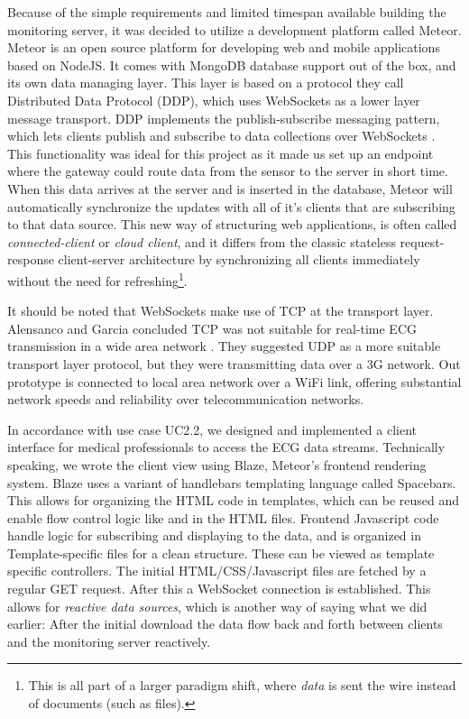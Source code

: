 
Because of the simple requirements and limited timespan available building the monitoring server, it was decided to utilize a development platform called Meteor. Meteor \cite{meteor} is an open source platform for developing web and mobile applications based on NodeJS. It comes with MongoDB database support out of the box, and its own data managing layer. This layer is based on a protocol they call Distributed Data Protocol (DDP), which uses WebSockets as a lower layer message transport. DDP implements the publish-subscribe messaging pattern, which lets clients publish and subscribe to data collections over WebSockets \cite{ddp:github}. This functionality was ideal for this project as it made us set up an endpoint where the gateway could route data from the sensor to the server in short time. When this data arrives at the server and is inserted in the database, Meteor will automatically synchronize the updates with all of it's clients that are subscribing to that data source. This new way of structuring web applications, is often called \textit{connected-client} or \textit{cloud client}, and it differs from the classic stateless request-response client-server architecture by synchronizing all clients immediately without the need for refreshing\footnote{ This is all part of a larger paradigm shift, where \textit{data} is sent the wire instead of documents (such as files).}.

It should be noted that WebSockets make use of TCP at the transport layer. Alensanco and Garcia concluded TCP was not suitable for real-time ECG transmission in a wide area network \cite{Alesanco:2010kc}. They suggested UDP as a more suitable transport layer protocol, but they were transmitting data over a 3G network. Out prototype is connected to local area network over a WiFi link, offering substantial network speeds and reliability over telecommunication networks.

In accordance with use case \textsc{UC2.2}, we designed and implemented a client interface for medical professionals to access the ECG data streams. Technically speaking, we wrote the client view using Blaze, Meteor's frontend rendering system. Blaze uses a variant of handlebars templating language\cite{handlebars} called Spacebars. This allows for organizing the HTML code in templates, which can be reused and enable flow control logic like  and  in the HTML files. Frontend Javascript code handle logic for subscribing and displaying to the data, and is organized in Template-specific files for a clean structure. These can be viewed as template specific controllers. The initial HTML/CSS/Javascript files are fetched by a regular GET request. After this a WebSocket connection is established. This allows for \textit{reactive data sources}, which is another way of saying what we did earlier: After the initial download the data flow back and forth between clients and the monitoring server reactively.

